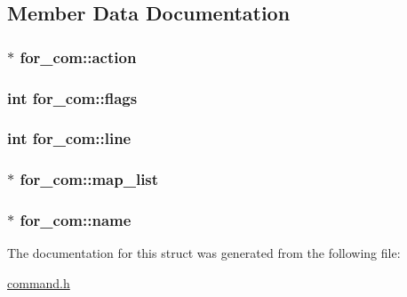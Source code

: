 \subsection{Member Data Documentation}
\subsubsection[{\texorpdfstring{action}{action}}]{$\ast$ for\+\_\+com\+::action}\hypertarget{structfor__com_a8f50a2c1bfc84c589ce327839c5e4805}{}\label{structfor__com_a8f50a2c1bfc84c589ce327839c5e4805}
\subsubsection[{\texorpdfstring{flags}{flags}}]{\setlength{\rightskip}{0pt plus 5cm}int for\+\_\+com\+::flags}\hypertarget{structfor__com_add9efd6ed9e84a42922fc7c6b273e3b9}{}\label{structfor__com_add9efd6ed9e84a42922fc7c6b273e3b9}
\subsubsection[{\texorpdfstring{line}{line}}]{\setlength{\rightskip}{0pt plus 5cm}int for\+\_\+com\+::line}\hypertarget{structfor__com_a268cba692dd4b85d33586df8286dcc6e}{}\label{structfor__com_a268cba692dd4b85d33586df8286dcc6e}
\subsubsection[{\texorpdfstring{map\+\_\+list}{map_list}}]{$\ast$ for\+\_\+com\+::map\+\_\+list}\hypertarget{structfor__com_ae9bc74158b6735a789842cbba12dea60}{}\label{structfor__com_ae9bc74158b6735a789842cbba12dea60}
\subsubsection[{\texorpdfstring{name}{name}}]{$\ast$ for\+\_\+com\+::name}\hypertarget{structfor__com_a954d92414437178eb2545211a43291db}{}\label{structfor__com_a954d92414437178eb2545211a43291db}


The documentation for this struct was generated from the following file\+:\begin{DoxyCompactItemize}
\item 
\hyperlink{command_8h}{command.\+h}\end{DoxyCompactItemize}
